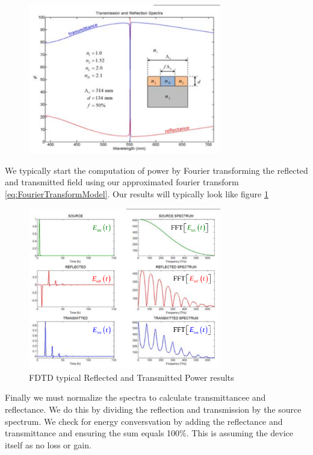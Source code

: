\documentclass[a4paper,10pt]{article}
\begin{document}
\begin{figure}[ht]
   \centering
     \includegraphics[width=0.75\textwidth]{RTPlot.png}
\end{figure}

We typically start the computation of power by Fourier transforming the reflected and transmitted field using our approximated fourier transform \eqref{eq:FourierTransformModel}.  Our results will typically look like figure \ref{fig:RTFieldsResults}

\begin{figure}[ht]
  \label{fig:RTFieldsResults}
   \centering
     \includegraphics[width=0.75\textwidth]{RTFieldsResults.png}
  \caption{FDTD typical Reflected and Transmitted Power results}
\end{figure}

Finally we must normalize the spectra to calculate transmittancee and reflectance.  We do this by dividing the reflection and transmission by the source spectrum.  We check for energy conversvation by adding the reflectance and transmittance and ensuring the sum equals 100\%.  This is assuming the device itself as no loss or gain.
\end{document}
